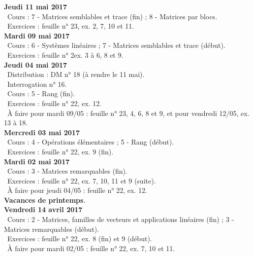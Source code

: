 \documentclass[12pt,a4paper]{article}
\begin{document}
\noindent\textbf{\bf Jeudi 11 mai 2017} \\
\bu\ Cours : 7 - Matrices semblables et trace (fin) ; 8 - Matrices par blocs.\\
\bu\ Exercices : feuille n° 23, ex. 2, 7, 10 et 11.\vspace{.4cm}\\

\noindent\textbf{Mardi 09 mai 2017}\\
\bu\ Cours : 6 - Systèmes linéaires ; 7 - Matrices semblables et trace (début).\\
\bu\ Exercices : feuille n° 2ex. 3 à 6, 8 et 9.\vspace{.4cm}\\

\noindent\textbf{\bf Jeudi 04 mai 2017} \\
\bu\ Distribution : DM n° 18 (à rendre le 11 mai).\\
\bu\ Interrogation n° 16.\\
\bu\ Cours : 5 - Rang (fin).\\
\bu\ Exercices : feuille n° 22, ex. 12.\\
\bu\ À faire pour mardi 09/05 : feuille n° 23, 4, 6, 8 et 9, et pour vendredi 12/05, ex. 13 à 18.\vspace{.4cm}\\

\noindent\textbf{Mercredi 03 mai 2017}\\
\bu\ Cours : 4 - Opérations élémentaires ; 5 - Rang (début).\\
\bu\ Exercices : feuille n° 22, ex. 9 (fin).\vspace{.4cm}\\

\noindent\textbf{Mardi 02 mai 2017}\\
\bu\ Cours : 3 - Matrices remarquables (fin).\\
\bu\ Exercices : feuille n° 22, ex. 7, 10, 11 et 9 (suite).\\
\bu\ À faire pour jeudi 04/05 : feuille n° 22, ex. 12.\vspace{.4cm}\\

\noindent\textbf{\bf Vacances de printemps}.\vspace{.4cm}\\
 
\noindent\textbf{Vendredi 14 avril 2017}\\
\bu\ Cours : 2 - Matrices, familles de vecteurs et applications linéaires (fin) ; 3 - Matrices 
remarquables (début).\\
\bu\ Exercices : feuille n° 22, ex. 8 (fin) et 9 (début).\\
\bu\ À faire pour mardi 02/05 : feuille n° 22, ex. 7, 10 et 11.\vspace{.4cm}\\
\end{document}
